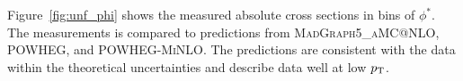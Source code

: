
Figure~\ref{fig:unf_phi} shows the measured absolute cross sections in bins 
of $\phi^*$. The measurements is compared to predictions from \textsc{MadGraph5\_aMC@NLO}, \textsc{POWHEG}, and \textsc{POWHEG-MiNLO}. The predictions are consistent with the data within the theoretical uncertainties and describe data well at low $p_{\mathrm{T}}$. 


